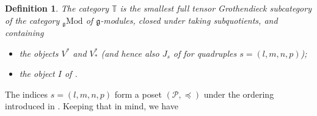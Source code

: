 \documentclass[11pt]{article}
\theoremstyle{plain}
\theoremstyle{nonumberplain}
\theoremstyle{plain}
\newtheorem{definition}[lemma]{Definition}
\numberwithin{equation}{section}
\theoremstyle{nonumberplain}
\newcommand\bT{{\mathbb T}}
\newcommand\cP{{\mathcal P}}
\newcommand\fg{{\mathfrak g}}
\newcommand\md{\mathrm{Mod}}
\newcommand\1{{\bf 1}}
\begin{document}
\begin{definition}\label{def:t}
  The category $\bT$ is the smallest full %
  tensor Grothendieck subcategory of the category ${}_{\fg}\md$ of $\fg$-modules, closed under taking subquotients, and containing
  \begin{itemize}
  \item[$-$] the objects $V^*$ and $V_*^*$ (and hence also $J_s$ of  for quadruples $s=(l,m,n,p)$);
  \item[$-$] the object $I$ of . 
  \end{itemize}
\end{definition}

The indices $s=(l,m,n,p)$ form a poset $(\cP,\preceq)$ under the ordering introduced in . Keeping that in mind, we have
\end{document}
